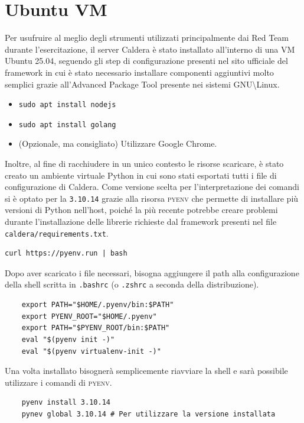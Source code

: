 \section{Ubuntu VM}
Per usufruire al meglio degli strumenti utilizzati principalmente dai Red Team durante l'esercitazione, il server Caldera è stato installato all'interno di una VM Ubuntu 25.04, seguendo gli step di configurazione presenti nel sito ufficiale del framework in cui è stato necessario installare componenti aggiuntivi molto semplici grazie all'Advanced Package Tool presente nei sistemi GNU\textbackslash Linux.
\begin{itemize}
    \item \texttt{sudo apt install nodejs}
    \item \texttt{sudo apt install golang}
    \item (Opzionale, ma consigliato) Utilizzare Google Chrome.
\end{itemize}
Inoltre, al fine di racchiudere in un unico contesto le risorse scaricare, è stato creato un ambiente virtuale Python in cui sono stati esportati tutti i file di configurazione di Caldera. Come versione scelta per l'interpretazione dei comandi si è optato per la \texttt{3.10.14} grazie alla risorsa \textsc{pyenv} che permette di installare più versioni di Python nell'host, poiché la più recente potrebbe creare problemi durante l'installazione delle librerie richieste dal framework presenti nel file \texttt{caldera/requirements.txt}.
\begin{Verbatim}[breaklines=true]
    curl https://pyenv.run | bash
\end{Verbatim}
Dopo aver scaricato i file necessari, bisogna aggiungere il path alla configurazione della shell scritta in \texttt{.bashrc} (o \texttt{.zshrc} a seconda della distribuzione).
\begin{Verbatim}
    export PATH="$HOME/.pyenv/bin:$PATH"
    export PYENV_ROOT="$HOME/.pyenv"
    export PATH="$PYENV_ROOT/bin:$PATH"
    eval "$(pyenv init -)"
    eval "$(pyenv virtualenv-init -)"
\end{Verbatim}
\vspace{0.5em}
Una volta installato bisognerà semplicemente riavviare la shell e sarà possibile utilizzare i comandi di \textsc{pyenv}.
\vspace{0.5em}
\begin{Verbatim}
    pyenv install 3.10.14
    pynev global 3.10.14 # Per utilizzare la versione installata
\end{Verbatim}
\vspace{0.5em}
